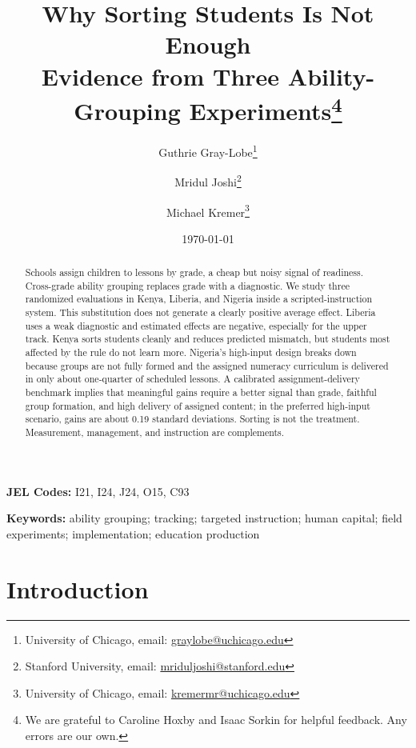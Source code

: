 \documentclass[11pt]{article}
\title{Why Sorting Students Is Not Enough \\ Evidence from Three Ability-Grouping Experiments\footnote{We are grateful to Caroline Hoxby and Isaac Sorkin for helpful feedback. Any errors are our own.} }
\begin{document}
\begin{titlepage}
\author{Guthrie Gray-Lobe\thanks{University of Chicago, email: \protect\href{mailto:graylobe@uchicago.edu}{graylobe@uchicago.edu}} \and Mridul Joshi\thanks{Stanford University, email: \protect\href{mailto:mriduljoshi@stanford.edu}{mriduljoshi@stanford.edu}} \and Michael Kremer\thanks{University of Chicago, email: \protect\href{mailto:kremermr@uchicago.edu}{kremermr@uchicago.edu}}}

\date{\today}
\maketitle

\begin{abstract}\noindent
Schools assign children to lessons by grade, a cheap but noisy signal of readiness. Cross-grade ability grouping replaces grade with a diagnostic. We study three randomized evaluations in Kenya, Liberia, and Nigeria inside a scripted-instruction system. This substitution does not generate a clearly positive average effect. Liberia uses a weak diagnostic and estimated effects are negative, especially for the upper track. Kenya sorts students cleanly and reduces predicted mismatch, but students most affected by the rule do not learn more. Nigeria's high-input design breaks down because groups are not fully formed and the assigned numeracy curriculum is delivered in only about one-quarter of scheduled lessons. A calibrated assignment-delivery benchmark implies that meaningful gains require a better signal than grade, faithful group formation, and high delivery of assigned content; in the preferred high-input scenario, gains are about 0.19 standard deviations. Sorting is not the treatment. Measurement, management, and instruction are complements.

\end{abstract}
\vspace{0.2cm}
\noindent\textbf{JEL Codes:} I21, I24, J24, O15, C93

\noindent\textbf{Keywords:} ability grouping; tracking; targeted instruction; human capital; field experiments; implementation; education production

\setcounter{page}{0}
\thispagestyle{empty}
\end{titlepage}
\doublespacing

\section{Introduction}
\label{sec:intro}
\end{document}
